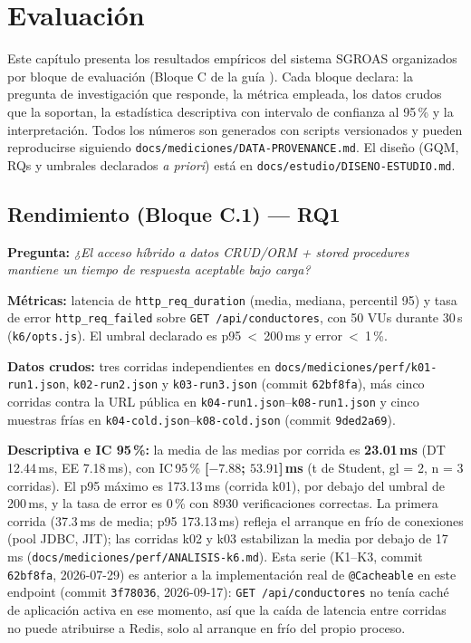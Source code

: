 \chapter{Evaluación}
\label{cap:evaluacion}

Este capítulo presenta los resultados empíricos del sistema SGROAS organizados por
bloque de evaluación (Bloque C de la guía \cite{uteq2026guia}). Cada bloque declara:
la pregunta de investigación que responde, la métrica empleada, los datos crudos que
la soportan, la estadística descriptiva con intervalo de confianza al 95\,\% y la
interpretación. Todos los números son generados con scripts versionados y pueden
reproducirse siguiendo \texttt{docs/mediciones/DATA-PROVENANCE.md}. El diseño
(GQM, RQs y umbrales declarados \emph{a priori}) está en
\texttt{docs/estudio/DISENO-ESTUDIO.md}.

\section{Rendimiento (Bloque C.1) — RQ1}
\label{sec:perf}

\textbf{Pregunta:} \emph{¿El acceso híbrido a datos CRUD/ORM + stored procedures
mantiene un tiempo de respuesta aceptable bajo carga?}

\textbf{Métricas:} latencia de \texttt{http\_req\_duration} (media, mediana,
percentil 95) y tasa de error \texttt{http\_req\_failed} sobre
\texttt{GET /api/conductores}, con 50 VUs durante 30\,s (\texttt{k6/opts.js}).
El umbral declarado es p95~<~200\,ms y error~<~1\,\%.

\textbf{Datos crudos:} tres corridas independientes en
\texttt{docs/mediciones/perf/k01-run1.json}, \texttt{k02-run2.json} y
\texttt{k03-run3.json} (commit \texttt{62bf8fa}), más cinco corridas contra la URL
pública en \texttt{k04-run1.json}--\texttt{k08-run1.json} y cinco muestras frías en
\texttt{k04-cold.json}--\texttt{k08-cold.json} (commit \texttt{9ded2a69}).

\textbf{Descriptiva e IC 95\,\%:} la media de las medias por corrida es
\textbf{23.01\,ms} (DT 12.44\,ms, EE 7.18\,ms), con IC\,95\,\%
\textbf{[$-7.88$; $53.91$]\,ms} (t de Student, gl = 2, n = 3 corridas). El p95
máximo es 173.13\,ms (corrida k01), por debajo del umbral de 200\,ms, y la tasa de
error es 0\,\% con 8930 verificaciones correctas. La primera corrida (37.3\,ms de
media; p95 173.13\,ms) refleja el arranque en frío de conexiones (pool JDBC,
JIT); las corridas k02 y k03 estabilizan la media por debajo de 17\,ms
(\texttt{docs/mediciones/perf/ANALISIS-k6.md}). Esta serie (K1--K3, commit
\texttt{62bf8fa}, 2026-07-29) es anterior a la implementación real de
\texttt{@Cacheable} en este endpoint (commit \texttt{3f78036}, 2026-09-17):
\texttt{GET /api/conductores} no tenía caché de aplicación activa en ese
momento, así que la caída de latencia entre corridas no puede atribuirse a
Redis, solo al arranque en frío del propio proceso.

